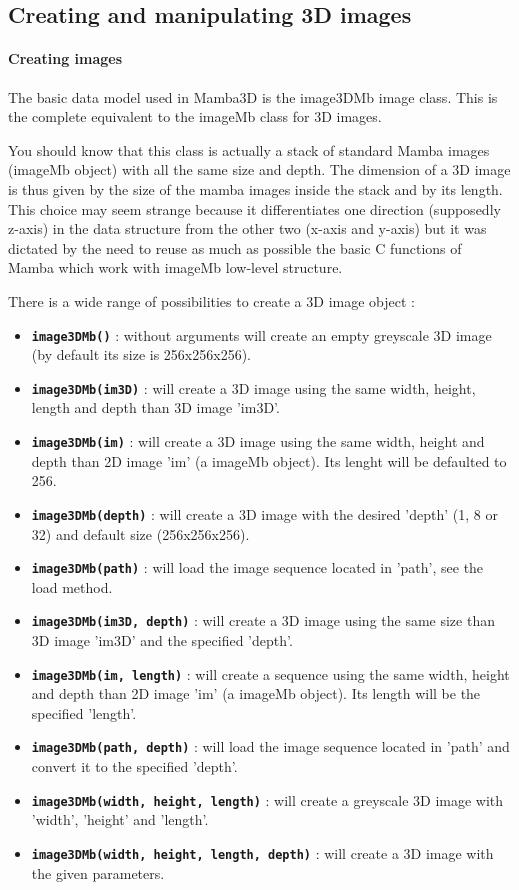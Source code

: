 \documentclass[a4paper,10pt,oneside]{article}
\begin{document}
\subsection{Creating and manipulating 3D images}

\paragraph{Creating images}

The basic data model used in Mamba3D is the image3DMb image class. This is the
complete equivalent to the imageMb class for 3D images.

You should know that this class is actually a stack of standard Mamba images
(imageMb object) with all the same size and depth. The dimension of a 3D image
is thus given by the size of the mamba images inside the stack and by its
length. This choice may seem strange because it differentiates one direction
(supposedly z-axis) in the data structure from the other two (x-axis and
y-axis) but it was dictated by the need to reuse as much as possible the 
basic C functions of Mamba which work with imageMb low-level structure.

There is a wide range of possibilities to create a 3D image object :
\begin{itemize}
\item \texttt{\textbf{image3DMb()}} : without arguments will create an empty
greyscale 3D image (by default its size is 256x256x256).
\item \texttt{\textbf{image3DMb(im3D)}} : will create a 3D image using the
same width, height, length and depth than 3D image 'im3D'.
\item \texttt{\textbf{image3DMb(im)}} : will create a 3D image using the same
width, height and depth than 2D image 'im' (a imageMb object). Its
lenght will be defaulted to 256.
\item \texttt{\textbf{image3DMb(depth)}} : will create a 3D image with the
desired 'depth' (1, 8 or 32) and default size (256x256x256).
\item \texttt{\textbf{image3DMb(path)}} : will load the image sequence located
in 'path', see the load method.
\item \texttt{\textbf{image3DMb(im3D, depth)}} : will create a 3D image using
the same size than 3D image 'im3D' and the specified 'depth'.
\item \texttt{\textbf{image3DMb(im, length)}} : will create a sequence using
the same width, height and depth than 2D image 'im' (a imageMb object). Its
length will be the specified 'length'.
\item \texttt{\textbf{image3DMb(path, depth)}} : will load the image sequence
located in 'path' and convert it to the specified 'depth'.
\item \texttt{\textbf{image3DMb(width, height, length)}} : will create a 
greyscale 3D image with 'width', 'height' and 'length'.
\item \texttt{\textbf{image3DMb(width, height, length, depth)}} : will create
a 3D image with the given parameters.
\end{itemize}
\end{document}
